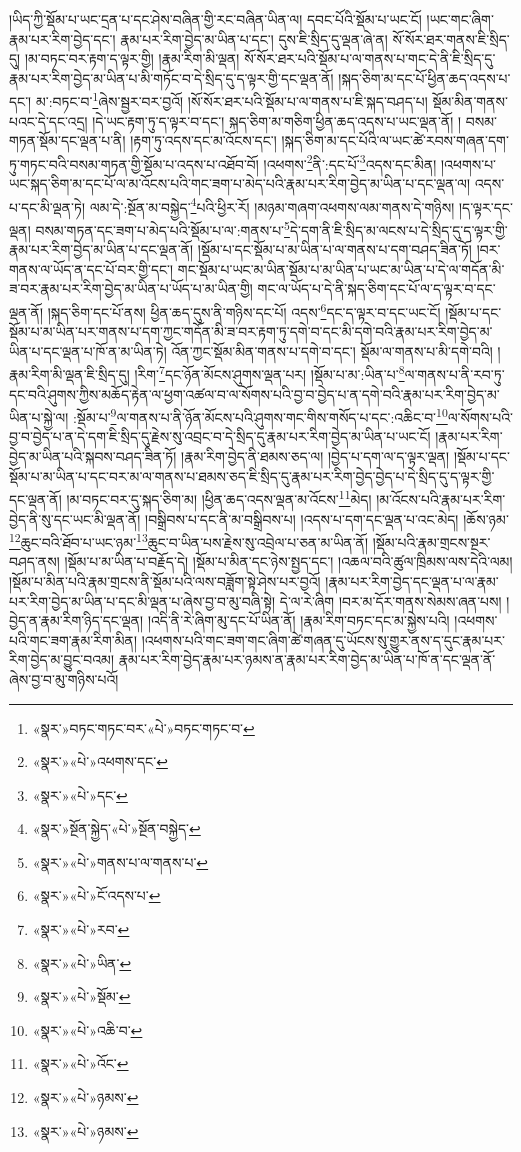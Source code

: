 །ཡིད་ཀྱི་སྡོམ་པ་ཡང་དྲན་པ་དང་ཤེས་བཞིན་གྱི་རང་བཞིན་ཡིན་ལ། དབང་པོའི་སྡོམ་པ་ཡང་ངོ། །ཡང་གང་ཞིག་རྣམ་པར་རིག་བྱེད་དང་། རྣམ་པར་རིག་བྱེད་མ་ཡིན་པ་དང་། དུས་ཇི་སྲིད་དུ་ལྡན་ཞེ་ན། སོ་སོར་ཐར་གནས་ཇི་སྲིད་དུ། །མ་བཏང་བར་རྟག་ད་ལྟར་གྱི། །རྣམ་རིག་མི་ལྡན། སོ་སོར་ཐར་པའི་སྡོམ་པ་ལ་གནས་པ་གང་དེ་ནི་ཇི་སྲིད་དུ་རྣམ་པར་རིག་བྱེད་མ་ཡིན་པ་མི་གཏོང་བ་དེ་སྲིད་དུ་ད་ལྟར་གྱི་དང་ལྡན་ནོ། །སྐད་ཅིག་མ་དང་པོ་ཕྱིན་ཆད་འདས་པ་དང་། མ་:བཏང་བ་\footnote{«སྣར་»བཏང་གཏང་བར་«པེ་»བཏང་གཏང་བ་}ཞེས་སྦྱར་བར་བྱའོ། །སོ་སོར་ཐར་པའི་སྡོམ་པ་ལ་གནས་པ་ཇི་སྐད་བཤད་པ། སྡོམ་མིན་གནས་པའང་དེ་དང་འདྲ། །དེ་ཡང་རྟག་ཏུ་ད་ལྟར་བ་དང་། སྐད་ཅིག་མ་གཅིག་ཕྱིན་ཆད་འདས་པ་ཡང་ལྡན་ནོ། །
བསམ་གཏན་སྡོམ་དང་ལྡན་པ་ནི། །རྟག་ཏུ་འདས་དང་མ་འོངས་དང་། །སྐད་ཅིག་མ་དང་པོའི་ལ་ཡང་ཚེ་རབས་གཞན་དག་ཏུ་གཏང་བའི་བསམ་གཏན་གྱི་སྡོམ་པ་འདས་པ་འཐོབ་བོ། །འཕགས་\footnote{«སྣར་»«པེ་»འཕགས་དང་}ནི་:དང་པོ་\footnote{«སྣར་»«པེ་»དང་}འདས་དང་མིན། །འཕགས་པ་ཡང་སྐད་ཅིག་མ་དང་པོ་ལ་མ་འོངས་པའི་གང་ཟག་པ་མེད་པའི་རྣམ་པར་རིག་བྱེད་མ་ཡིན་པ་དང་ལྡན་ལ། འདས་པ་དང་མི་ལྡན་ཏེ། ལམ་དེ་:སྔོན་མ་བསྐྱེད་\footnote{«སྣར་»སྔོན་སྐྱེད་«པེ་»སྔོན་བསྐྱེད་}པའི་ཕྱིར་རོ། །མཉམ་གཞག་འཕགས་ལམ་གནས་དེ་གཉིས། །ད་ལྟར་དང་ལྡན། བསམ་གཏན་དང་ཟག་པ་མེད་པའི་སྡོམ་པ་ལ་:གནས་པ་\footnote{«སྣར་»«པེ་»གནས་པ་ལ་གནས་པ་}དེ་དག་ནི་ཇི་སྲིད་མ་ལངས་པ་དེ་སྲིད་དུ་ད་ལྟར་གྱི་རྣམ་པར་རིག་བྱེད་མ་ཡིན་པ་དང་ལྡན་ནོ། །སྡོམ་པ་དང་སྡོམ་པ་མ་ཡིན་པ་ལ་གནས་པ་དག་བཤད་ཟིན་ཏོ། །བར་གནས་ལ་ཡོད་ན་དང་པོ་བར་གྱི་དང་། གང་སྡོམ་པ་ཡང་མ་ཡིན་སྡོམ་པ་མ་ཡིན་པ་ཡང་མ་ཡིན་པ་དེ་ལ་གདོན་མི་ཟ་བར་རྣམ་པར་རིག་བྱེད་མ་ཡིན་པ་ཡོད་པ་མ་ཡིན་གྱི། གང་ལ་ཡོད་པ་དེ་ནི་སྐད་ཅིག་དང་པོ་ལ་ད་ལྟར་བ་དང་ལྡན་ནོ། །སྐད་ཅིག་དང་པོ་ནས། ཕྱིན་ཆད་དུས་ནི་གཉིས་དང་པོ། འདས་\footnote{«སྣར་»«པེ་»ངོ་འདས་པ་}དང་ད་ལྟར་བ་དང་ཡང་ངོ། །སྡོམ་པ་དང་སྡོམ་པ་མ་ཡིན་པར་གནས་པ་དག་ཀྱང་གདོན་མི་ཟ་བར་རྟག་ཏུ་དགེ་བ་དང་མི་དགེ་བའི་རྣམ་པར་རིག་བྱེད་མ་ཡིན་པ་དང་ལྡན་པ་ཁོ་ན་མ་ཡིན་ཏེ། འོན་ཀྱང་སྡོམ་མིན་གནས་པ་དགེ་བ་དང་། སྡོམ་ལ་གནས་པ་མི་དགེ་བའི། །རྣམ་རིག་མི་ལྡན་ཇི་སྲིད་དུ། །རིག་\footnote{«སྣར་»«པེ་»རབ་}དང་ཉོན་མོངས་ཤུགས་ལྡན་པར། །སྡོམ་པ་མ་:ཡིན་པ་\footnote{«སྣར་»«པེ་»ཡིན་}ལ་གནས་པ་ནི་རབ་ཏུ་དང་བའི་ཤུགས་ཀྱིས་མཆོད་རྟེན་ལ་ཕྱག་འཚལ་བ་ལ་སོགས་པའི་བྱ་བ་བྱེད་པ་ན་དགེ་བའི་རྣམ་པར་རིག་བྱེད་མ་ཡིན་པ་སྐྱེ་ལ། :སྡོམ་པ་\footnote{«སྣར་»«པེ་»སྡོམ་}ལ་གནས་པ་ནི་ཉོན་མོངས་པའི་ཤུགས་གང་གིས་གསོད་པ་དང་:འཆིང་བ་\footnote{«སྣར་»«པེ་»འཆི་བ་}ལ་སོགས་པའི་བྱ་བ་བྱེད་པ་ན་དེ་དག་ཇི་སྲིད་དུ་རྗེས་སུ་འབྲང་བ་དེ་སྲིད་དུ་རྣམ་པར་རིག་བྱེད་མ་ཡིན་པ་ཡང་ངོ། །རྣམ་པར་རིག་བྱེད་མ་ཡིན་པའི་སྐབས་བཤད་ཟིན་ཏོ། །རྣམ་རིག་བྱེད་ནི་ཐམས་ཅད་ལ། །བྱེད་པ་དག་ལ་ད་ལྟར་ལྡན། །སྡོམ་པ་དང་སྡོམ་པ་མ་ཡིན་པ་དང་བར་མ་ལ་གནས་པ་ཐམས་ཅད་ཇི་སྲིད་དུ་རྣམ་པར་རིག་བྱེད་བྱེད་པ་དེ་སྲིད་དུ་ད་ལྟར་གྱི་དང་ལྡན་ནོ། །མ་བཏང་བར་དུ་སྐད་ཅིག་མ། །ཕྱིན་ཆད་འདས་ལྡན་མ་འོངས་\footnote{«སྣར་»«པེ་»འོང་}མེད། །མ་འོངས་པའི་རྣམ་པར་རིག་བྱེད་ནི་སུ་དང་ཡང་མི་ལྡན་ནོ། །བསྒྲིབས་པ་དང་ནི་མ་བསྒྲིབས་པ། །འདས་པ་དག་དང་ལྡན་པ་འང་མེད། །ཆོས་ཉམ་\footnote{«སྣར་»«པེ་»ཉམས་}ཆུང་བའི་ཐོབ་པ་ཡང་ཉམ་\footnote{«སྣར་»«པེ་»ཉམས་}ཆུང་བ་ཡིན་པས་རྗེས་སུ་འབྲེལ་པ་ཅན་མ་ཡིན་ནོ། །སྡོམ་པའི་རྣམ་གྲངས་སྔར་བཤད་ནས། །སྡོམ་པ་མ་ཡིན་པ་བརྗོད་དེ། །སྡོམ་པ་མིན་དང་ཉེས་སྤྱད་དང་། །འཆལ་བའི་ཚུལ་ཁྲིམས་ལས་དེའི་ལམ། །སྡོམ་པ་མིན་པའི་རྣམ་གྲངས་ནི་སྡོམ་པའི་ལས་བཟློག་སྟེ་ཤེས་པར་བྱའོ། །རྣམ་པར་རིག་བྱེད་དང་ལྡན་པ་ལ་རྣམ་པར་རིག་བྱེད་མ་ཡིན་པ་དང་མི་ལྡན་པ་ཞེས་བྱ་བ་མུ་བཞི་སྟེ། དེ་ལ་རེ་ཞིག །བར་མ་དོར་གནས་སེམས་ཞན་པས། །བྱེད་ན་རྣམ་རིག་ཉིད་དང་ལྡན། །འདི་ནི་རེ་ཞིག་མུ་དང་པོ་ཡིན་ནོ། །རྣམ་རིག་བཏང་དང་མ་སྐྱེས་པའི། །འཕགས་པའི་གང་ཟག་རྣམ་རིག་མིན། །འཕགས་པའི་གང་ཟག་གང་ཞིག་ཚེ་གཞན་དུ་ཡོངས་སུ་གྱུར་ནས་ད་དུང་རྣམ་པར་རིག་བྱེད་མ་བྱུང་བའམ། རྣམ་པར་རིག་བྱེད་རྣམ་པར་ཉམས་ན་རྣམ་པར་རིག་བྱེད་མ་ཡིན་པ་ཁོ་ན་དང་ལྡན་ནོ་ཞེས་བྱ་བ་མུ་གཉིས་པའོ། 